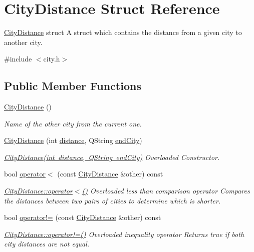 \hypertarget{struct_city_distance}{}\section{City\+Distance Struct Reference}
\label{struct_city_distance}


\mbox{\hyperlink{struct_city_distance}{City\+Distance}} struct A struct which contains the distance from a given city to another city.  




{\ttfamily \#include $<$city.\+h$>$}

\subsection*{Public Member Functions}
\begin{DoxyCompactItemize}
\item 
\mbox{\hyperlink{struct_city_distance_aa486f287fb876e7aec9d41340a9a2b62}{City\+Distance}} ()
\begin{DoxyCompactList}\small\item\em Name of the other city from the current one. \end{DoxyCompactList}\item 
\mbox{\hyperlink{struct_city_distance_a5710d1d7374892efd201c4cd187d9e42}{City\+Distance}} (int \mbox{\hyperlink{struct_city_distance_aabe1e1bba711dab73cd70f1105c35c9e}{distance}}, Q\+String \mbox{\hyperlink{struct_city_distance_a7f1fe8d0c76af2abf5bc5c6bd1800e7f}{end\+City}})
\begin{DoxyCompactList}\small\item\em \mbox{\hyperlink{struct_city_distance_a5710d1d7374892efd201c4cd187d9e42}{City\+Distance(int distance, Q\+String end\+City)}} Overloaded Constructor. \end{DoxyCompactList}\item 
bool \mbox{\hyperlink{struct_city_distance_a6195d187d1f0309e67ee62b3a5b56b86}{operator$<$}} (const \mbox{\hyperlink{struct_city_distance}{City\+Distance}} \&other) const
\begin{DoxyCompactList}\small\item\em \mbox{\hyperlink{struct_city_distance_a6195d187d1f0309e67ee62b3a5b56b86}{City\+Distance\+::operator$<$()}} Overloaded less than comparison operator Compares the distances between two pairs of cities to determine which is shorter. \end{DoxyCompactList}\item 
bool \mbox{\hyperlink{struct_city_distance_ae56feb19d11926e9d3bc03b5abfc9b48}{operator!=}} (const \mbox{\hyperlink{struct_city_distance}{City\+Distance}} \&other) const
\begin{DoxyCompactList}\small\item\em \mbox{\hyperlink{struct_city_distance_ae56feb19d11926e9d3bc03b5abfc9b48}{City\+Distance\+::operator!=()}} Overloaded inequality operator Returns true if both city distances are not equal. \end{DoxyCompactList}\end{DoxyCompactItemize}
